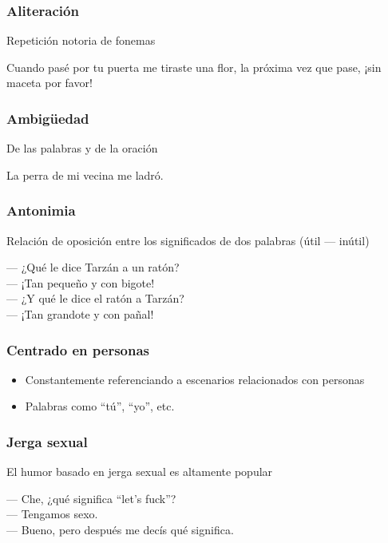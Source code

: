 \begin{frame}
    \frametitle{Aliteración}

    Repetición notoria de fonemas

    \begin{example}
        Cuando pasé por tu puerta me tiraste una flor, la próxima vez que pase, ¡sin maceta por favor!
    \end{example}
\end{frame}

\begin{frame}
    \frametitle{Ambigüedad}
    
    De las palabras y de la oración

    \begin{example}
        La perra de mi vecina me ladró.
    \end{example}
\end{frame}

\begin{frame}
    \frametitle{Antonimia}
    
    Relación de oposición entre los significados de dos palabras (útil --- inútil)

    \begin{example}
        --- ¿Qué le dice Tarzán a un ratón? \\
        --- ¡Tan pequeño y con bigote! \\
        --- ¿Y qué le dice el ratón a Tarzán? \\
        --- ¡Tan grandote y con pañal! \\
    \end{example}
\end{frame}

\begin{frame}
    \frametitle{Centrado en personas}
    
    \begin{itemize}
        \item Constantemente referenciando a escenarios relacionados con personas
        \item Palabras como “tú”, “yo”, etc.
    \end{itemize}
\end{frame}

\begin{frame}
    \frametitle{Jerga sexual}
    
    El humor basado en jerga sexual es altamente popular

    \begin{example}
        --- Che, ¿qué significa “let’s fuck”? \\
        --- Tengamos sexo. \\
        --- Bueno, pero después me decís qué significa.
    \end{example}
\end{frame}

